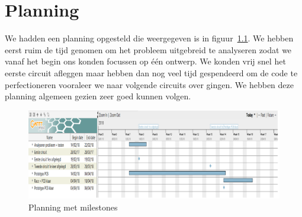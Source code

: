 \chapter{Planning}
We hadden een planning opgesteld die weergegeven is in figuur~\ref{fig:planning}. We hebben eerst ruim de tijd genomen om het probleem uitgebreid te analyseren zodat we vanaf het begin ons konden focussen op \'e\'en ontwerp. We konden vrij snel het eerste circuit afleggen maar hebben dan nog veel tijd gespendeerd om de code te perfectioneren vooraleer we naar volgende circuits over gingen. We hebben deze planning algemeen gezien zeer goed kunnen volgen.
\begin{figure}[h]
\centering
\includegraphics[width=1\textwidth]{planning.png}
\caption{Planning met milestones}
\label{fig:planning}
\end{figure}

